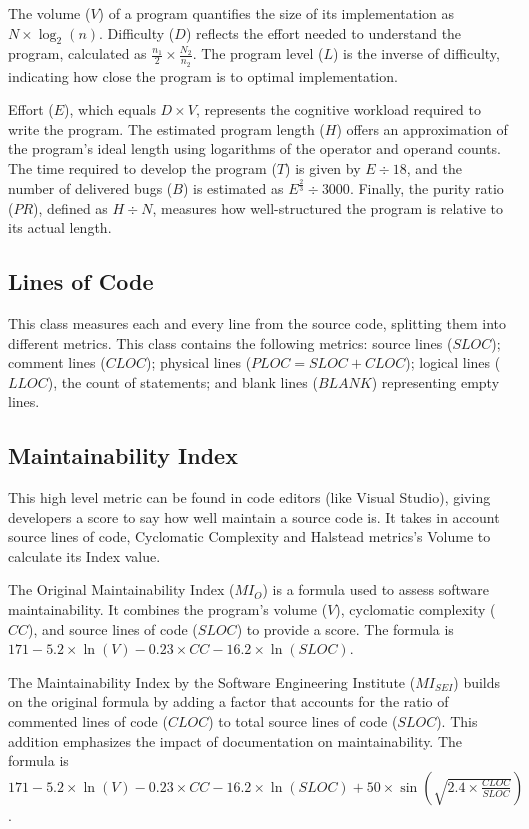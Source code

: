 The volume (\(V\)) of a program quantifies the size of its implementation as \(N \times \log_2(n)\). Difficulty (\(D\)) reflects the effort needed to understand the program, calculated as \(\frac{n_1}{2} \times \frac{N_2}{n_2}\). The program level (\(L\)) is the inverse of difficulty, indicating how close the program is to optimal implementation.

Effort (\(E\)), which equals \(D \times V\), represents the cognitive workload required to write the program. The estimated program length (\(H\)) offers an approximation of the program's ideal length using logarithms of the operator and operand counts. The time required to develop the program (\(T\)) is given by \(E \div 18\), and the number of delivered bugs (\(B\)) is estimated as \(E^{\frac{2}{3}} \div 3000\). Finally, the purity ratio (\(PR\)), defined as \(H \div N\), measures how well-structured the program is relative to its actual length.

\subsection{Lines of Code}

This class measures each and every line from the source code, splitting them into different metrics.
This class contains the following metrics: source lines ($SLOC$); comment lines ($CLOC$); physical lines ($PLOC = SLOC + CLOC$);
logical lines ($LLOC$), the count of statements; and blank lines ($BLANK$) representing empty lines.

\subsection{Maintainability Index}

This high level metric can be found in code editors (like Visual Studio), giving developers a score to say how well maintain
a source code is. It takes in account source lines of code, Cyclomatic Complexity and Halstead metrics's Volume to calculate its Index value.

The Original Maintainability Index (\(MI_O\)) is a formula used to assess software maintainability.
It combines the program's volume (\(V\)), cyclomatic complexity (\(CC\)), and source lines of code (\(SLOC\)) to provide a score.
The formula is \(171 - 5.2 \times \ln(V) - 0.23 \times CC - 16.2 \times \ln(SLOC)\).

The Maintainability Index by the Software Engineering Institute (\(MI_{SEI}\)) builds on the original formula by
adding a factor that accounts for the ratio of commented lines of code (\(CLOC\)) to total source lines of code (\(SLOC\)).
This addition emphasizes the impact of documentation on maintainability.
The formula is \(171 - 5.2 \times \ln(V) - 0.23 \times CC - 16.2 \times \ln(SLOC) + 50 \times \sin(\sqrt{2.4 \times \frac{CLOC}{SLOC}})\).

